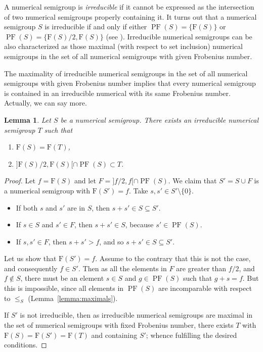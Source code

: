 \documentclass[11pt]{amsart}
\newtheorem{lemma}[theorem]{Lemma}
\theoremstyle{remark}
\begin{document}
A numerical semigroup is \emph{irreducible} if it cannot be expressed as the intersection of two numerical semigroups properly containing it. It turns out that a numerical semigroup $S$ is irreducible if and only if either $\operatorname{PF}(S)=\{\mathrm F(S)\}$ or $\operatorname{PF}(S)=\{\mathrm F(S)/2,\mathrm F(S)\}$ (see \cite[Chapter 3]{NS}). Irreducible numerical semigroups can be also characterized as those maximal (with respect to set inclusion) numerical semigroups in the set of all numerical semigroups with given Frobenius number.

The maximality of irreducible numerical semigroups in the set of all numerical semigroups with given Frobenius number implies that every numerical semigroup is contained in an irreducible numerical with its same Frobenius number. Actually, we can say more.

\begin{lemma}\label{lemma:puedo-cubrir-f2}
Let $S$ be a numerical semigroup. There exists an irreducible numerical semigroup $T$ such that
\begin{enumerate}
\item $\mathrm F(S)=\mathrm F(T)$,
\item $]\mathrm F(S)/2,\mathrm F(S)[\cap \operatorname{PF}(S)\subset T$.
\end{enumerate}
\end{lemma}
\begin{proof}
Let $f=\mathrm F(S)$ and let $F=]f/2,f[\cap \operatorname{PF}(S)$. We claim that $S'=S\cup F$ is a numerical semigroup with $\mathrm F(S')=f$. Take $s,s'\in S'\setminus\{0\}$. 
\begin{itemize}
\item If both $s$ and $s'$ are in $S$, then $s+s'\in S\subseteq S'$.
\item If $s\in S$ and $s'\in F$, then $s+s'\in S$, because $s'\in \operatorname{PF}(S)$.
\item If $s,s'\in F$, then $s+s'>f$, and so $s+s'\in S\subseteq S'$.
\end{itemize}
Let us show that $\mathrm F(S')=f$. Assume to the contrary that this is not the case, and consequently $f\in S'$. Then as all the elements in $F$ are greater than $f/2$, and $f\not\in S$, there must be an element $s\in S$ and $g\in \operatorname{PF}(S)$ such that $g+s=f$. But this is impossible, since all elements in $\operatorname{PF}(S)$ are incomparable with respect to $\le_S$ (Lemma~\ref{lemma:maximals}).

If $S'$ is not irreducible, then as irreducible numerical semigroups are maximal in the set of numerical semigroups with fixed Frobenius number, there exists $T$ with $\mathrm F(S)=\mathrm F(S')=\mathrm F(T)$ and containing $S'$; whence fulfilling the desired conditions.
\end{proof}
\end{document}
